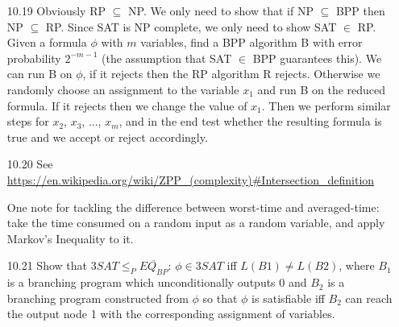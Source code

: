 \begin{itemize}
\begin{center}
	\end{center}

	\item[10.19]
	Obviously RP $ \subseteq $ NP. We only need to show that if NP $ \subseteq $ BPP then NP $ \subseteq $ RP. Since SAT is NP complete, we only need to show SAT $ \in $ RP. Given a formula $ \phi $ with $ m $ variables, find a BPP algorithm B with error probability $ 2^{-m-1} $ (the assumption that SAT $ \in $ BPP guarantees this). We can run B on $ \phi $, if it rejects then the RP algorithm R rejects. Otherwise we randomly choose an assignment to the variable $ x_1 $ and run B on the reduced formula. If it rejects then we change the value of $ x_1 $. Then we perform similar steps for $ x_2 $, $ x_3 $, ..., $ x_m $, and in the end test whether the resulting formula is true and we accept or reject accordingly.
	
	\item[10.20]
	See \url{https://en.wikipedia.org/wiki/ZPP_(complexity)#Intersection_definition}
	
	One note for tackling the difference between worst-time and averaged-time: take the time consumed on a random input as a random variable, and apply Markov's Inequality to it.
	
	\item[10.21]
	Show that $ 3SAT \le_P \overline{EQ_{BP}} $: $ \phi \in 3SAT $ iff $ L(B1) \ne L(B2) $, where $ B_1 $ is a branching program which unconditionally outputs 0 and $ B_2 $ is a branching program constructed from $ \phi $ so that $ \phi $ is satisfiable iff $ B_2 $ can reach the output node 1 with the corresponding assignment of variables.
	

\end{itemize}
